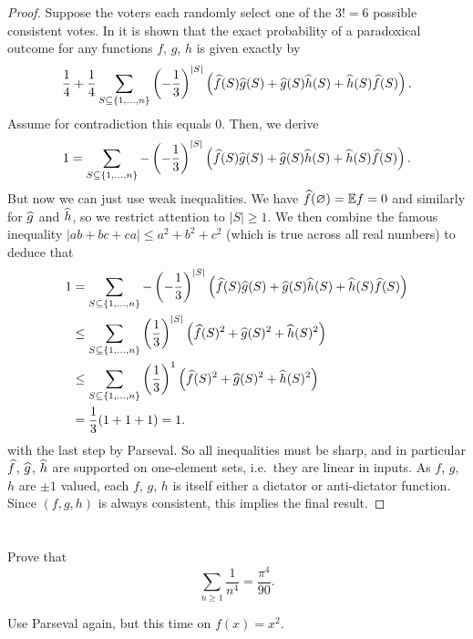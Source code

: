 \begin{proof}
	Suppose the voters each randomly select one of the $3!=6$
	possible consistent votes.
	In  it is shown
	that the exact probability of a paradoxical outcome
	for any functions $f$, $g$, $h$ is given exactly by
	\[ \frac14 + \frac14 \sum_{S \subseteq \{1, \dots, n\}}
		\left( -\frac13 \right)^{\left\lvert S \right\rvert} 
		\left( \widehat f(S) \widehat g(S) + \widehat g(S) \widehat h(S) + \widehat h(S) \widehat f(S) \right).
		\]
	Assume for contradiction this equals $0$.
	Then, we derive
	\[ 1 = \sum_{S \subseteq \{1, \dots, n\}}
		-\left( -\frac13 \right)^{\left\lvert S \right\rvert} 
		\left( \widehat f(S) \widehat g(S) + \widehat g(S) \widehat h(S) + \widehat h(S) \widehat f(S) \right). \]
	But now we can just use weak inequalities.
	We have $\widehat f(\varnothing) = \mathbb E f = 0$ and similarly for $\widehat g$ and $\widehat h$,
	so we restrict attention to $|S| \ge 1$.
	We then combine the famous inequality $|ab+bc+ca| \le a^2+b^2+c^2$
	(which is true across all real numbers) to deduce that
	\begin{align*}
		1 &= \sum_{S \subseteq \{1, \dots, n\}}
		-\left( -\frac13 \right)^{\left\lvert S \right\rvert} 
		\left( \widehat f(S) \widehat g(S) + \widehat g(S) \widehat h(S) + \widehat h(S) \widehat f(S) \right) \\
		&\le \sum_{S \subseteq \{1, \dots, n\}}
		\left( \frac13 \right)^{\left\lvert S \right\rvert} 
		\left( \widehat f(S)^2 + \widehat g(S)^2 + \widehat h(S)^2 \right) \\
		&\le \sum_{S \subseteq \{1, \dots, n\}} \left( \frac13 \right)^1
		\left( \widehat f(S)^2 + \widehat g(S)^2 + \widehat h(S)^2 \right) \\
		&= \frac13 (1+1+1) = 1.
	\end{align*}
	with the last step by Parseval.
	So all inequalities must be sharp, and in particular $\widehat f$, $\widehat g$, $\widehat h$
	are supported on one-element sets, i.e.\ they are linear in inputs.
	As $f$, $g$, $h$ are $\pm 1$ valued, each $f$, $g$, $h$ is itself
	either a dictator or anti-dictator function.
	Since $(f,g,h)$ is always consistent, this implies the final result.
\end{proof}


\section{\problemhead}

\begin{problem}
	Prove that
	\[ \sum_{n \ge 1} \frac{1}{n^4} = \frac{\pi^4}{90}. \]
	\begin{hint}
		Use Parseval again, but this time on $f(x) = x^2$.
	\end{hint}
\end{problem}

